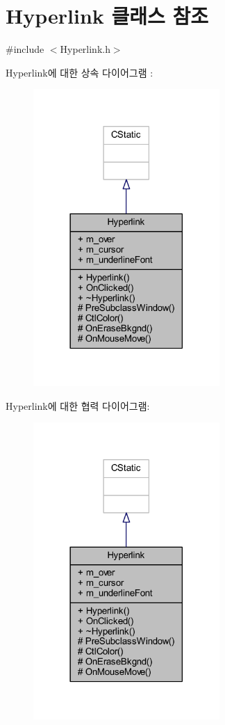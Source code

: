 \hypertarget{class_hyperlink}{}\section{Hyperlink 클래스 참조}
\label{class_hyperlink}


{\ttfamily \#include $<$Hyperlink.\+h$>$}



Hyperlink에 대한 상속 다이어그램 \+: \nopagebreak
\begin{figure}[H]
\begin{center}
\leavevmode
\includegraphics[width=201pt]{class_hyperlink__inherit__graph}
\end{center}
\end{figure}


Hyperlink에 대한 협력 다이어그램\+:\nopagebreak
\begin{figure}[H]
\begin{center}
\leavevmode
\includegraphics[width=201pt]{class_hyperlink__coll__graph}
\end{center}
\end{figure}
